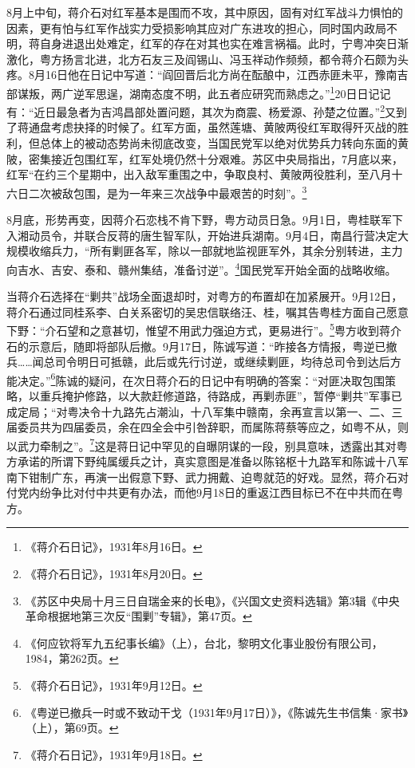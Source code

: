 8月上中旬，蒋介石对红军基本是围而不攻，其中原因，固有对红军战斗力惧怕的因素，更有怕与红军作战实力受损影响其应对广东进攻的担心，同时国内政局不明，蒋自身进退出处难定，红军的存在对其也实在难言祸福。此时，宁粤冲突日渐激化，粤方扬言北进，北方石友三及阎锡山、冯玉祥动作频频，都令蒋介石颇为头疼。8月16日他在日记中写道：“阎回晋后北方尚在酝酿中，江西赤匪未平，豫南吉部谋叛，两广逆军思逞，湖南态度不明，此五者应研究而熟虑之。”\footnote{《蒋介石日记》，1931年8月16日。}20日日记记有：“近日最急者为吉鸿昌部处置问题，其次为商震、杨爱源、孙楚之位置。”\footnote{《蒋介石日记》，1931年8月20日。}又到了蒋通盘考虑抉择的时候了。红军方面，虽然莲塘、黄陂两役红军取得歼灭战的胜利，但总体上的被动态势尚未彻底改变，当国民党军以绝对优势兵力转向东面的黄陂，密集接近包围红军，红军处境仍然十分艰难。苏区中央局指出，7月底以来，红军“在约三个星期中，出入敌军重围之中，争取良村、黄陂两役胜利，至八月十六日二次被敌包围，是为一年来三次战争中最艰苦的时刻”。\footnote{《苏区中央局十月三日自瑞金来的长电》，《兴国文史资料选辑》第3辑《中央革命根据地第三次反“围剿”专辑》，第47页。}


8月底，形势再变，因蒋介石恋栈不肯下野，粤方动员日急。9月1日，粤桂联军下入湘动员令，并联合反蒋的唐生智军队，开始进兵湖南。9月4日，南昌行营决定大规模收缩兵力，“所有剿匪各军，除以一部就地监视匪军外，其余分别转进，主力向吉水、吉安、泰和、赣州集结，准备讨逆”。\footnote{《何应钦将军九五纪事长编》（上），台北，黎明文化事业股份有限公司，1984，第262页。}国民党军开始全面的战略收缩。


当蒋介石选择在“剿共”战场全面退却时，对粤方的布置却在加紧展开。9月12日，蒋介石通过同桂系李、白关系密切的吴忠信联络汪、桂，嘱其告粤桂方面自己愿意下野：“介石望和之意甚切，惟望不用武力强迫方式，更易进行”。\footnote{《蒋介石日记》，1931年9月12日。}粤方收到蒋介石的示意后，随即将部队后撤。9月17日，陈诚写道：“昨接各方情报，粤逆已撤兵……闻总司令明日可抵赣，此后或先行讨逆，或继续剿匪，均待总司令到达后方能决定。”\footnote{《粤逆已撤兵一时或不致动干戈（1931年9月17日）》，《陈诚先生书信集·家书》（上），第69页。}陈诚的疑问，在次日蒋介石的日记中有明确的答案：“对匪决取包围策略，以重兵掩护修路，以大款赶修道路，待路成，再剿赤匪”，暂停“剿共”军事已成定局；“对粤决令十九路先占潮汕，十八军集中赣南，余再宣言以第一、二、三届委员共为四届委员，余在四全会中引咎辞职，而属陈蒋蔡等应之，如粤不从，则以武力牵制之”。\footnote{《蒋介石日记》，1931年9月18日。}这是蒋日记中罕见的自曝阴谋的一段，别具意味，透露出其对粤方承诺的所谓下野纯属缓兵之计，真实意图是准备以陈铭枢十九路军和陈诚十八军南下钳制广东，再演一出假意下野、武力拥戴、迫粤就范的好戏。显然，蒋介石对付党内纷争比对付中共更有办法，而他9月18日的重返江西目标已不在中共而在粤方。


